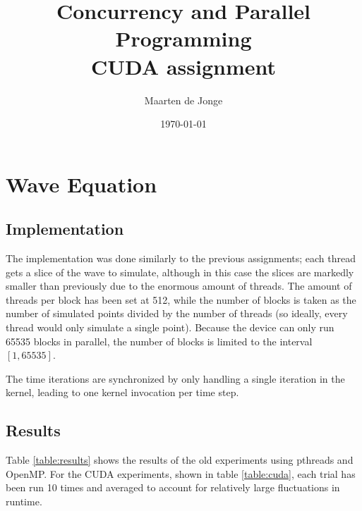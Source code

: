\documentclass[a4paper]{article}
\author{Maarten de Jonge}
\date{\today}
\title{Concurrency and Parallel Programming \\
\large{CUDA assignment}}
\begin{document}
\maketitle

\section*{Wave Equation}
\subsection*{Implementation}
The implementation was done similarly to the previous assignments; each thread
gets a slice of the wave to simulate, although in this case the slices are
markedly smaller than previously due to the enormous amount of threads. The
amount of threads per block has been set at 512, while the number of blocks is
taken as the number of simulated points divided by the number of threads (so
ideally, every thread would only simulate a single point). Because the device
can only run 65535 blocks in parallel, the number of blocks is limited to the
interval $[1, 65535]$.

The time iterations are synchronized by only handling a single iteration in the
kernel, leading to one kernel invocation per time step.

\subsection*{Results}
Table \ref{table:results} shows the results of the old experiments using
pthreads and OpenMP.
For the CUDA experiments, shown in table \ref{table:cuda}, each trial has been
run 10 times and averaged to account for relatively large fluctuations in
runtime.
\end{document}
